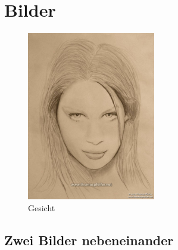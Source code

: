 \section{Bilder}
\label{sec:Bilder}

\lipsum[1]
\begin{figure}[h]
	\centering
		\includegraphics[width=0.50\textwidth]{bilder.jpg}
	\caption{Gesicht}
	\label{fig:bilder}
\end{figure}
\lipsum[1-2]

\subsection{Zwei Bilder nebeneinander}
\label{sec:ZweiBilderNebeneinander}

\lipsum[1]

